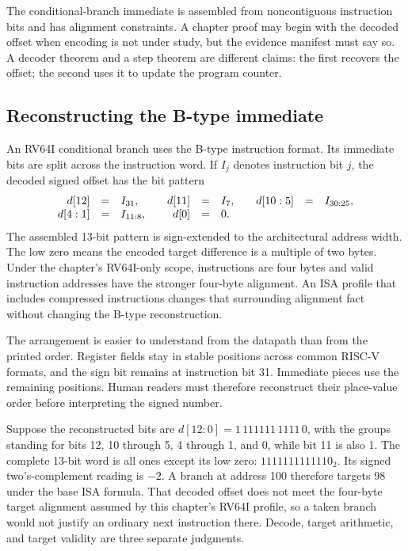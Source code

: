 The conditional-branch immediate is assembled from noncontiguous instruction
bits and has alignment constraints. A chapter proof may begin with the decoded
offset when encoding is not under study, but the evidence manifest must say so.
A decoder theorem and a step theorem are different claims: the first recovers
the offset; the second uses it to update the program counter.

\subsection{Reconstructing the B-type immediate}

An RV64I conditional branch uses the B-type instruction format. Its immediate
bits are split across the instruction word. If \(I_j\) denotes instruction bit
\(j\), the decoded signed offset has the bit pattern
\[
\begin{array}{rcl@{\qquad}rcl@{\qquad}rcl}
d[12]&=&I_{31}, & d[11]&=&I_7, & d[10:5]&=&I_{30:25},\\
d[4:1]&=&I_{11:8}, & d[0]&=&0.&&&
\end{array}
\]
The assembled 13-bit pattern is sign-extended to the architectural address
width. The low zero means the encoded target difference is a multiple of two
bytes. Under the chapter's RV64I-only scope, instructions are four bytes and
valid instruction addresses have the stronger four-byte alignment. An ISA
profile that includes compressed instructions changes that surrounding
alignment fact without changing the B-type reconstruction.

The arrangement is easier to understand from the datapath than from the
printed order. Register fields stay in stable positions across common RISC-V
formats, and the sign bit remains at instruction bit 31. Immediate pieces use
the remaining positions. Human readers must therefore reconstruct their
place-value order before interpreting the signed number.

\begin{example}[title={Decode a backward RV64I branch offset}]
Suppose the reconstructed bits are
\(d[12:0]=1\,111111\,1111\,0\), with the groups standing for bits 12,
10 through 5, 4 through 1, and 0, while bit 11 is also 1. The complete
13-bit word is all ones except its low zero: \(1111111111110_2\). Its signed
two's-complement reading is \(-2\). A branch at address 100 therefore targets
98 under the base ISA formula. That decoded offset does not meet the
four-byte target alignment assumed by this chapter's RV64I profile, so a
taken branch would not justify an ordinary next instruction there. Decode,
target arithmetic, and target validity are three separate judgments.
\end{example}

